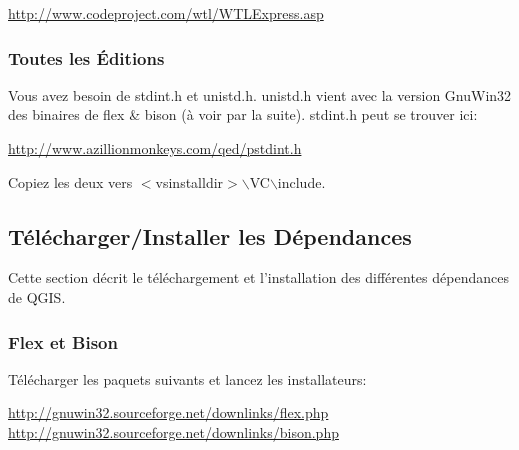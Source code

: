 \url{http://www.codeproject.com/wtl/WTLExpress.asp}

% 
% 

\subsubsection{Toutes les Éditions}
Vous avez besoin de stdint.h et unistd.h. unistd.h vient avec la version GnuWin32 des binaires de flex \& bison (à voir par la suite). stdint.h peut se trouver ici:

\url{http://www.azillionmonkeys.com/qed/pstdint.h}

Copiez les deux vers $<$vsinstalldir$>$$\backslash$VC$\backslash$include.


\subsection{Télécharger/Installer les Dépendances}
Cette section décrit le téléchargement et l'installation des différentes dépendances de QGIS.

% 

\subsubsection{Flex et Bison}
Télécharger les paquets suivants et lancez les installateurs:

\url{http://gnuwin32.sourceforge.net/downlinks/flex.php} \\
\url{http://gnuwin32.sourceforge.net/downlinks/bison.php}

